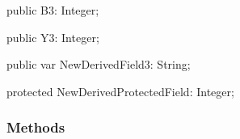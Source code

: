 \documentclass{report}
\newif\ifpdf
\begin{document}
\begin{list}{}
\begin{flushleft}
\ifpdf
\end{flushleft}
\fi


\par  \label{ok_inherited_members.TNewDerived-B3}
\item[\textbf{B3}\hfill]
\ifpdf
\begin{flushleft}
\fi
\begin{ttfamily}
public B3: Integer;\end{ttfamily}

\ifpdf
\end{flushleft}
\fi


\par  \label{ok_inherited_members.TNewDerived-Y3}
\item[\textbf{Y3}\hfill]
\ifpdf
\begin{flushleft}
\fi
\begin{ttfamily}
public Y3: Integer;\end{ttfamily}

\ifpdf
\end{flushleft}
\fi


\par  \label{ok_inherited_members.TNewDerived-NewDerivedField3}
\item[\textbf{NewDerivedField3}\hfill]
\ifpdf
\begin{flushleft}
\fi
\begin{ttfamily}
public var NewDerivedField3: String;\end{ttfamily}

\ifpdf
\end{flushleft}
\fi


\par  \label{ok_inherited_members.TNewDerived-NewDerivedProtectedField}
\item[\textbf{NewDerivedProtectedField}\hfill]
\ifpdf
\begin{flushleft}
\fi
\begin{ttfamily}
protected NewDerivedProtectedField: Integer;\end{ttfamily}

\ifpdf
\end{flushleft}
\fi


\par  \end{list}
\subsubsection*{\large{\textbf{Methods}}\normalsize\hspace{1ex}\hfill}
\end{document}
